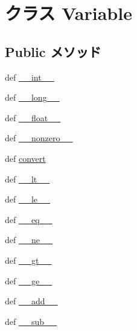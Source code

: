 \hypertarget{classm5_1_1util_1_1smartdict_1_1Variable}{
\section{クラス Variable}
\label{classm5_1_1util_1_1smartdict_1_1Variable}
}
\subsection*{Public メソッド}
\begin{DoxyCompactItemize}
\item 
def \hyperlink{classm5_1_1util_1_1smartdict_1_1Variable_a28a958e3c802a3137bcf4b44d5cef95c}{\_\-\_\-int\_\-\_\-}
\item 
def \hyperlink{classm5_1_1util_1_1smartdict_1_1Variable_a44b0d01b7aeedc4b3c9052a2c6ba1645}{\_\-\_\-long\_\-\_\-}
\item 
def \hyperlink{classm5_1_1util_1_1smartdict_1_1Variable_aa9419090a59d0dc1a40065e76ab0baf9}{\_\-\_\-float\_\-\_\-}
\item 
def \hyperlink{classm5_1_1util_1_1smartdict_1_1Variable_a14f4a7f4cbfde7254adc73da3b2de9a5}{\_\-\_\-nonzero\_\-\_\-}
\item 
def \hyperlink{classm5_1_1util_1_1smartdict_1_1Variable_afe69e9190aa0b3889a9a5f63a42799f5}{convert}
\item 
def \hyperlink{classm5_1_1util_1_1smartdict_1_1Variable_a6a45920abc8ecf2d458d174ea7304f8a}{\_\-\_\-lt\_\-\_\-}
\item 
def \hyperlink{classm5_1_1util_1_1smartdict_1_1Variable_a83166e4aabc2805e71aef3a43f016181}{\_\-\_\-le\_\-\_\-}
\item 
def \hyperlink{classm5_1_1util_1_1smartdict_1_1Variable_a449f8fd74d358c0ad641b6c6d6917ba0}{\_\-\_\-eq\_\-\_\-}
\item 
def \hyperlink{classm5_1_1util_1_1smartdict_1_1Variable_ad69df72a6bf0be3525fe45cd2f77f343}{\_\-\_\-ne\_\-\_\-}
\item 
def \hyperlink{classm5_1_1util_1_1smartdict_1_1Variable_a728aec3eafa75fd847ce0bf8f954efde}{\_\-\_\-gt\_\-\_\-}
\item 
def \hyperlink{classm5_1_1util_1_1smartdict_1_1Variable_a3ee81c22a31860655ba6bf83ff5a8f36}{\_\-\_\-ge\_\-\_\-}
\item 
def \hyperlink{classm5_1_1util_1_1smartdict_1_1Variable_ae92943b217d29a45ddcbbba2f7208afc}{\_\-\_\-add\_\-\_\-}
\item 
def \hyperlink{classm5_1_1util_1_1smartdict_1_1Variable_a92f51217c100657d0bf6f97b150c0a7c}{\_\-\_\-sub\_\-\_\-}

\end{DoxyCompactItemize}
